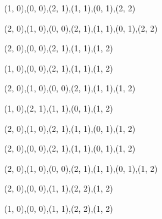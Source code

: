\begin{figure}[H]
\begin{subfigure}[b]{0.13\textwidth}
    \resizebox{\linewidth}{!} {
       {{(1, 0),(0, 0),(2, 1),(1, 1),(0, 1),(2, 2)}} {{}}
    }
  \end{subfigure}
  \begin{subfigure}[b]{0.13\textwidth}
    \resizebox{\linewidth}{!} {
       {{(2, 0),(1, 0),(0, 0),(2, 1),(1, 1),(0, 1),(2, 2)}} {{}}
    }
  \end{subfigure}
  \begin{subfigure}[b]{0.13\textwidth}
    \resizebox{\linewidth}{!} {
       {{(2, 0),(0, 0),(2, 1),(1, 1),(1, 2)}} {{}}
    }
  \end{subfigure}
  \begin{subfigure}[b]{0.13\textwidth}
    \resizebox{\linewidth}{!} {
       {{(1, 0),(0, 0),(2, 1),(1, 1),(1, 2)}} {{}}
    }
  \end{subfigure}
  \begin{subfigure}[b]{0.13\textwidth}
    \resizebox{\linewidth}{!} {
       {{(2, 0),(1, 0),(0, 0),(2, 1),(1, 1),(1, 2)}} {{}}
    }
  \end{subfigure}
  \begin{subfigure}[b]{0.13\textwidth}
    \resizebox{\linewidth}{!} {
       {{(1, 0),(2, 1),(1, 1),(0, 1),(1, 2)}} {{}}
    }
  \end{subfigure}
  \begin{subfigure}[b]{0.13\textwidth}
    \resizebox{\linewidth}{!} {
       {{(2, 0),(1, 0),(2, 1),(1, 1),(0, 1),(1, 2)}} {{}}
    }
  \end{subfigure}
  \begin{subfigure}[b]{0.13\textwidth}
    \resizebox{\linewidth}{!} {
       {{(2, 0),(0, 0),(2, 1),(1, 1),(0, 1),(1, 2)}} {{}}
    }
  \end{subfigure}
  \begin{subfigure}[b]{0.13\textwidth}
    \resizebox{\linewidth}{!} {
       {{(2, 0),(1, 0),(0, 0),(2, 1),(1, 1),(0, 1),(1, 2)}} {{}}
    }
  \end{subfigure}
  \begin{subfigure}[b]{0.13\textwidth}
    \resizebox{\linewidth}{!} {
       {{(2, 0),(0, 0),(1, 1),(2, 2),(1, 2)}} {{}}
    }
  \end{subfigure}
  \begin{subfigure}[b]{0.13\textwidth}
    \resizebox{\linewidth}{!} {
       {{(1, 0),(0, 0),(1, 1),(2, 2),(1, 2)}} {{}}
    }
  \end{subfigure}

\end{figure}
